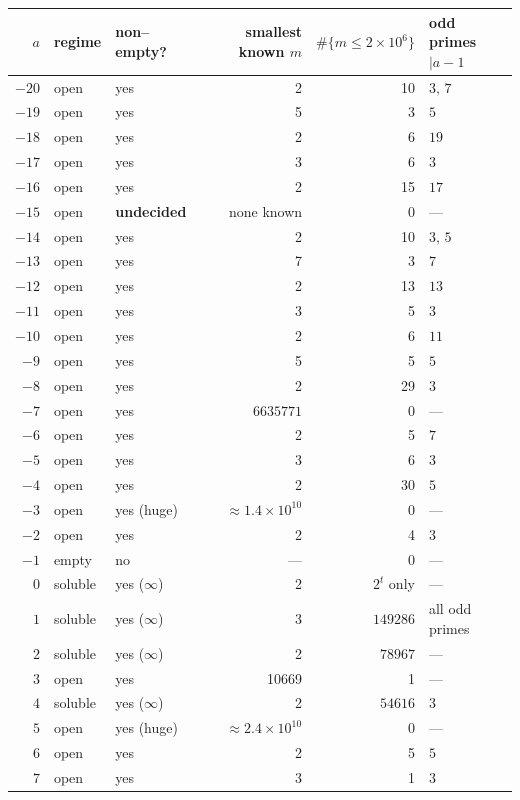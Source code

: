 \documentclass[11pt,reqno]{amsart}
\theoremstyle{plain}
\theoremstyle{definition}
\theoremstyle{remark}
\begin{document}
\begin{table}[H]
\centering
\small
\begin{tabular}{r l l r r l}
\toprule
$a$ & regime & non--empty? & smallest known $m$ & $\#\{m\le2\!\times\!10^{6}\}$ & odd primes $\mid a-1$\\
\midrule
$-20$ & open & yes & 2 & 10 & $3,\,7$ \\
$-19$ & open & yes & 5 & 3 & $5$ \\
$-18$ & open & yes & 2 & 6 & $19$ \\
$-17$ & open & yes & 3 & 6 & $3$ \\
$-16$ & open & yes & 2 & 15 & $17$ \\
$-15$ & open & \textbf{undecided} & none known & 0 & --- \\
$-14$ & open & yes & 2 & 10 & $3,\,5$ \\
$-13$ & open & yes & 7 & 3 & $7$ \\
$-12$ & open & yes & 2 & 13 & $13$ \\
$-11$ & open & yes & 3 & 5 & $3$ \\
$-10$ & open & yes & 2 & 6 & $11$ \\
$-9$ & open & yes & 5 & 5 & $5$ \\
$-8$ & open & yes & 2 & 29 & $3$ \\
$-7$ & open & yes & $6635771$ & 0 & --- \\
$-6$ & open & yes & 2 & 5 & $7$ \\
$-5$ & open & yes & 3 & 6 & $3$ \\
$-4$ & open & yes & 2 & 30 & $5$ \\
$-3$ & open & yes (huge) & $\approx1.4\times10^{10}$ & 0 & --- \\
$-2$ & open & yes & 2 & 4 & $3$ \\
$-1$ & empty & no & --- & 0 & --- \\
$0$ & soluble & yes ($\infty$) & 2 & $2^{t}$ only & --- \\
$1$ & soluble & yes ($\infty$) & 3 & $149286$ & all odd primes \\
$2$ & soluble & yes ($\infty$) & 2 & $78967$ & --- \\
$3$ & open & yes & 10669 & 1 & --- \\
$4$ & soluble & yes ($\infty$) & 2 & $54616$ & $3$ \\
$5$ & open & yes (huge) & $\approx2.4\times10^{10}$ & 0 & --- \\
$6$ & open & yes & 2 & 5 & $5$ \\
$7$ & open & yes & 3 & 1 & $3$ \\

\end{tabular}
\end{table}
\end{document}
